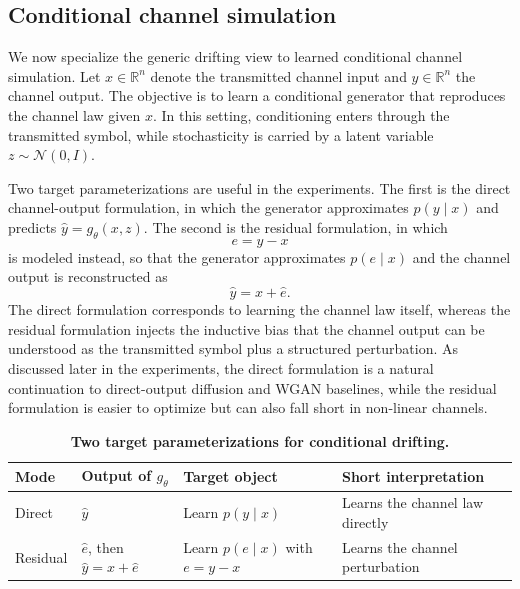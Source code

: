 \documentclass[conference]{IEEEtran}
\newcommand{\tablestyle}[2]{\setlength{\tabcolsep}{#1}\renewcommand{\arraystretch}{#2}}
\newcommand{\tablefontsize}{\fontsize{7.2pt}{8.4pt}\selectfont}
\begin{document}
\subsection{Conditional channel simulation}
We now specialize the generic drifting view to learned conditional channel simulation.
Let \(x \in \mathbb{R}^n\) denote the transmitted channel input and \(y \in \mathbb{R}^n\) the channel output.
The objective is to learn a conditional generator that reproduces the channel law given \(x\).
In this setting, conditioning enters through the transmitted symbol, while stochasticity is carried by a latent variable \(z \sim \mathcal{N}(0, I)\).

Two target parameterizations are useful in the experiments.
The first is the direct channel-output formulation, in which the generator approximates \(p(y \mid x)\) and predicts \(\hat{y} = g_\theta(x, z)\).
The second is the residual formulation, in which
\begin{equation}
e = y - x
\end{equation}
is modeled instead, so that the generator approximates \(p(e \mid x)\) and the channel output is reconstructed as
\begin{equation}
\hat{y} = x + \hat{e}.
\end{equation}
The direct formulation corresponds to learning the channel law itself, whereas the residual formulation injects the inductive bias that the channel output can be understood as the transmitted symbol plus a structured perturbation.
As discussed later in the experiments, the direct formulation is a natural continuation to direct-output diffusion and WGAN baselines, while the residual formulation is easier to optimize but can also fall short in non-linear channels.

\begin{table}[t]
\caption{\textbf{Two target parameterizations for conditional drifting.}}
\label{tab:drifting_modes}
\centering
\tablestyle{5pt}{1.03}
\tablefontsize
\begin{tabular}{@{}p{1.0cm}p{1.50cm}p{1.60cm}p{2.00cm}@{}}
\toprule
Mode & Output of \(g_\theta\) & Target object & Short interpretation \\
\midrule
Direct & \(\hat y\) & Learn \(p(y \mid x)\) & Learns the channel law directly\\
Residual & \(\hat e\), then \(\hat y=x+\hat e\) & Learn \(p(e \mid x)\) with \(e=y-x\) & Learns the channel perturbation\\
\bottomrule
\end{tabular}
\end{table}
\end{document}
